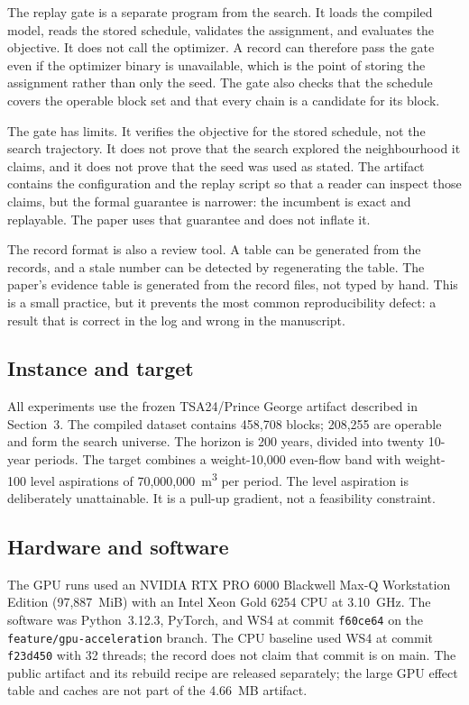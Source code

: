 \documentclass[11pt]{article}
\begin{document}
The replay gate is a separate program from the search. It loads the compiled model, reads the stored
schedule, validates the assignment, and evaluates the objective. It does not call the optimizer. A
record can therefore pass the gate even if the optimizer binary is unavailable, which is the point of
storing the assignment rather than only the seed. The gate also checks that the schedule covers the
operable block set and that every chain is a candidate for its block.

The gate has limits. It verifies the objective for the stored schedule, not the search trajectory. It
does not prove that the search explored the neighbourhood it claims, and it does not prove that the
seed was used as stated. The artifact contains the configuration and the replay script so that a
reader can inspect those claims, but the formal guarantee is narrower: the incumbent is exact and
replayable. The paper uses that guarantee and does not inflate it.

The record format is also a review tool. A table can be generated from the records, and a stale number
can be detected by regenerating the table. The paper's evidence table is generated from the record
files, not typed by hand. This is a small practice, but it prevents the most common reproducibility
defect: a result that is correct in the log and wrong in the manuscript.

\subsection{Instance and target}

All experiments use the frozen TSA24/Prince George artifact described in
Section~3. The compiled dataset contains 458,708 blocks; 208,255 are operable and
form the search universe. The horizon is 200 years, divided into twenty 10-year
periods. The target combines a weight-10,000 even-flow band with weight-100 level
aspirations of 70,000,000~m\textsuperscript{3} per period. The level aspiration is deliberately
unattainable. It is a pull-up gradient, not a feasibility constraint.

\subsection{Hardware and software}

The GPU runs used an NVIDIA RTX PRO 6000 Blackwell Max-Q Workstation Edition
(97,887~MiB) with an Intel Xeon Gold 6254 CPU at 3.10~GHz. The software was
Python~3.12.3, PyTorch, and WS4 \citep{ws4} at commit \texttt{f60ce64} on the
\texttt{feature/gpu-acceleration} branch. The CPU baseline used WS4 at commit
\texttt{f23d450} with 32 threads; the record does not claim that commit is on main. The public artifact and its rebuild recipe are
released separately; the large GPU effect table and caches are not part of the
4.66~MB artifact.
\end{document}
